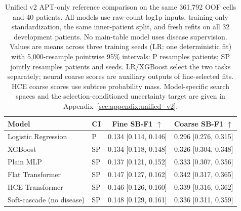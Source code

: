 \begin{table}[H]
\centering\small
\setlength{\tabcolsep}{4pt}
\begin{tabular}{llcc}
\toprule
Model & CI & Fine SB-F1 $\uparrow$ & Coarse SB-F1 $\uparrow$ \\
\midrule
Logistic Regression & P & 0.134 [0.114, 0.146] & 0.296 [0.276, 0.315] \\
XGBoost & SP & 0.134 [0.118, 0.148] & 0.326 [0.304, 0.348] \\
Plain MLP & SP & 0.137 [0.121, 0.152] & 0.333 [0.307, 0.356] \\
Flat Transformer & SP & 0.147 [0.127, 0.162] & 0.342 [0.317, 0.365] \\
HCE Transformer & SP & 0.146 [0.126, 0.160] & 0.339 [0.316, 0.362] \\
Soft-cascade (no disease) & SP & 0.148 [0.129, 0.161] & 0.336 [0.311, 0.359] \\
\bottomrule
\end{tabular}
\caption{Unified v2 APT-only reference comparison on the same 361{,}792 OOF cells and 40 patients. All models use raw-count log1p inputs, training-only standardization, the same inner-patient split, and fresh refits on all 32 development patients. No main-table model uses disease supervision. Values are means across three training seeds (LR: one deterministic fit) with 5{,}000-resample pointwise 95\% intervals: P resamples patients; SP jointly resamples patients and seeds. LR/XGBoost select the two tasks separately; neural coarse scores are auxiliary outputs of fine-selected fits. HCE coarse scores use subtree probability mass. Model-specific search spaces and the selection-conditioned uncertainty target are given in Appendix~\ref{sec:appendix:unified_v2}.}
\label{tab:main}
\end{table}
